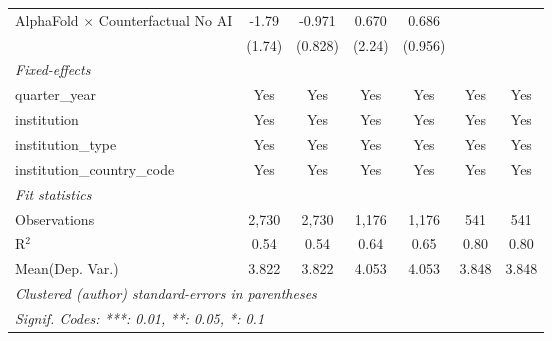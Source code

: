 \begin{tabular}{lcccccc}
   AlphaFold $\times$ Counterfactual No AI  & -1.79   & -0.971        & 0.670   & 0.686        &        &   \\   
                                            & (1.74)  & (0.828)       & (2.24)  & (0.956)      &        &   \\   
   \midrule
   \emph{Fixed-effects}\\
   quarter\_year                            & Yes     & Yes           & Yes     & Yes          & Yes    & Yes\\  
   institution                              & Yes     & Yes           & Yes     & Yes          & Yes    & Yes\\  
   institution\_type                        & Yes     & Yes           & Yes     & Yes          & Yes    & Yes\\  
   institution\_country\_code               & Yes     & Yes           & Yes     & Yes          & Yes    & Yes\\  
   \midrule
   \emph{Fit statistics}\\
   Observations                             & 2,730   & 2,730         & 1,176   & 1,176        & 541    & 541\\  
   R$^2$                                    & 0.54    & 0.54          & 0.64    & 0.65         & 0.80   & 0.80\\  
Mean(Dep. Var.) & 3.822 & 3.822 & 4.053 & 4.053 & 3.848 & 3.848 \\
   \midrule \midrule
   \multicolumn{7}{l}{\emph{Clustered (author) standard-errors in parentheses}}\\
   \multicolumn{7}{l}{\emph{Signif. Codes: ***: 0.01, **: 0.05, *: 0.1}}\\
\end{tabular}
\par\endgroup
